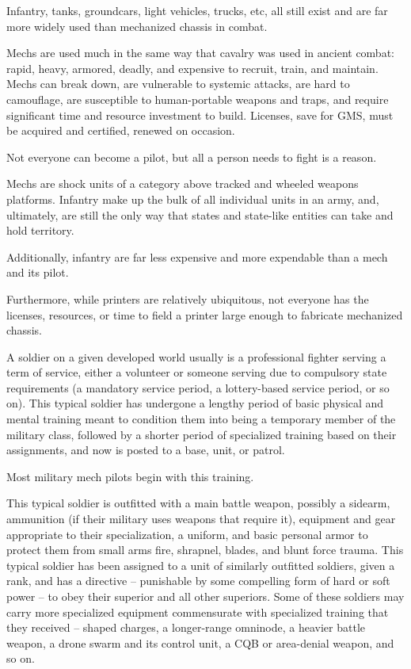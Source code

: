 Infantry, tanks, groundcars, light vehicles, trucks, etc, all still exist and are far more widely used  
than mechanized chassis in combat. 
 

Mechs are used much in the same way that cavalry was used in ancient combat: rapid, heavy,  
armored, deadly, and expensive to recruit, train, and maintain. Mechs can break down, are  
vulnerable to systemic attacks, are hard to camouflage, are susceptible to human-portable  
weapons and traps, and require significant time and resource investment to build. Licenses, save  
for GMS, must be acquired and certified, renewed on occasion. 
 

Not everyone can become a pilot, but all a person needs to fight is a reason.   
 

Mechs are shock units of a category above tracked and wheeled weapons platforms. Infantry  
make up the bulk of all individual units in an army, and, ultimately, are still the only way that  
states and state-like entities can take and hold territory. 
 

Additionally, infantry are far less expensive and more expendable than a mech and its pilot. 
 

Furthermore, while printers are relatively ubiquitous, not everyone has the licenses, resources, or  
time to field a printer large enough to fabricate mechanized chassis.
 

A soldier on a given developed world usually is a professional fighter serving a term of service,  
either a volunteer or someone serving due to compulsory state requirements (a mandatory  
service period, a lottery-based service period, or so on). This typical soldier has undergone a  
lengthy period of basic physical and mental training meant to condition them into being a  
temporary member of the military class, followed by a shorter period of specialized training  
based on their assignments, and now is posted to a base, unit, or patrol. 
 

Most military mech pilots begin with this training. 
 

                                                                                                            


This typical soldier is outfitted with a main battle weapon, possibly a sidearm, ammunition (if their  
military uses weapons that require it), equipment and gear appropriate to their specialization, a  
uniform, and basic personal armor to protect them from small arms fire, shrapnel, blades, and  
blunt force trauma. This typical soldier has been assigned to a unit of similarly outfitted soldiers,  
given a rank, and has a directive -- punishable by some compelling form of hard or soft power --  
to obey their superior and all other superiors. Some of these soldiers may carry more specialized  
equipment commensurate with specialized training that they received -- shaped charges, a  
longer-range omninode, a heavier battle weapon, a drone swarm and its control unit, a CQB or  
area-denial weapon, and so on. 
 

